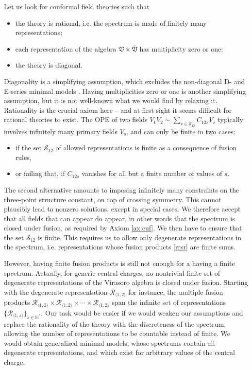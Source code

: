 \documentclass[12pt, a4paper, notitlepage, twoside]{report}
\numberwithin{equation}{section}
\theoremstyle{break}
\begin{document}
Let us look for conformal field theories such that
\begin{itemize}
\item the theory is rational, i.e.
the spectrum is made of finitely many representations;
\item each representation of the algebra $\mathfrak{V}\times \overline{\mathfrak{V}}$ has multiplicity zero or one;
\item the theory is diagonal.
\end{itemize}
Diagonality is a simplifying assumption, which excludes the non-diagonal D- and E-series minimal models \cite{fms97}.
Having multiplicities zero or one is another simplifying assumption, but it is not well-known what we would find by relaxing it. 
Rationality is the crucial axiom here -- and at first sight it seems difficult for rational theories to exist.
The OPE of two fields $V_1V_2\sim \sum_{s \in \mathcal{S}_{12}} C_{12s} V_s$ typically involves infinitely many primary fields $V_s$, and can only be finite in two cases:
\begin{itemize}
 \item if the set $\mathcal{S}_{12}$ of allowed representations is finite as a consequence of fusion rules,
 \item or failing that, if $C_{12s}$ vanishes for all but a finite number of values of $s$. 
\end{itemize}
The second alternative amounts to imposing infinitely many constraints on the three-point structure constant, on top of crossing symmetry. 
This cannot plausibly lead to nonzero solutions, except in special cases. 
We therefore accept that all fields that can appear do appear, in other words that the spectrum is closed under fusion, as required by Axiom \ref{ax:cuf}.
We then have to ensure that the set $\mathcal{S}_{12}$ is finite.
This requires us to allow
only degenerate representations in the spectrum, i.e. representations whose fusion products \eqref{rrsr} are finite sums. 

However, having finite fusion products is still not enough for a having a finite spectrum. 
Actually, for generic central charges, no nontrivial finite set of degenerate representations of the Virasoro algebra is closed under fusion.
Starting with the degenerate representation $\mathcal{R}_{\langle 1,2 \rangle}$ for instance, the multiple fusion products $\mathcal{R}_{\langle 1,2 \rangle}\times \mathcal{R}_{\langle 1,2 \rangle}\times \cdots \times \mathcal{R}_{\langle 1,2 \rangle}$ span the infinite set of representations $\{\mathcal{R}_{\langle 1,s \rangle}\}_{s\in{\mathbb{N}}^*}$.
Our task would be easier if we would weaken our assumptions and replace the rationality of the theory with the discreteness of the spectrum, allowing the number of representations to be countable instead of finite.
We would obtain generalized minimal models, whose spectrums contain all degenerate representations, and which exist for arbitrary values of the central charge. 
\end{document}
